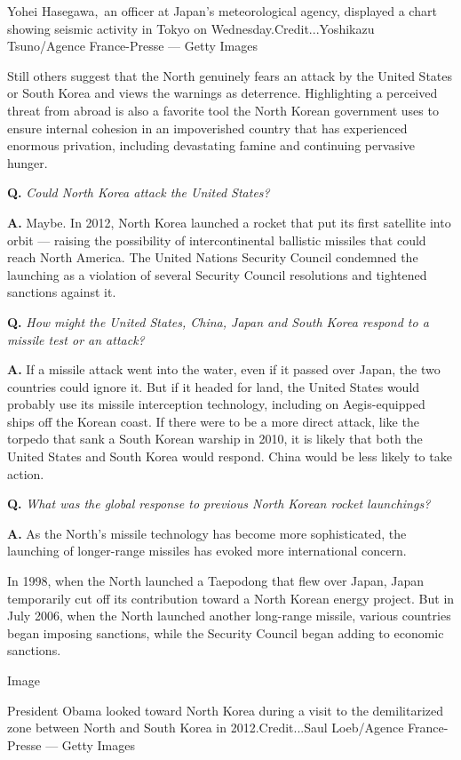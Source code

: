 Yohei Hasegawa,~an officer at Japan's meteorological agency, displayed a
chart showing seismic activity in Tokyo on Wednesday.Credit...Yoshikazu
Tsuno/Agence France-Presse --- Getty Images

Still others suggest that the North genuinely fears an attack by the
United States or South Korea and views the warnings as deterrence.
Highlighting a perceived threat from abroad is also a favorite tool the
North Korean government uses to ensure internal cohesion in an
impoverished country that has experienced enormous privation, including
devastating famine and continuing pervasive hunger.

\textbf{Q.} \emph{Could North Korea attack the United States?}

\textbf{A.} Maybe. In 2012, North Korea launched a rocket that put its
first satellite into orbit --- raising the possibility of
intercontinental ballistic missiles that could reach North America. The
United Nations Security Council condemned the launching as a violation
of several Security Council resolutions and tightened sanctions against
it.

\textbf{Q.} \emph{How might the United States, China, Japan and South
Korea respond to a missile test or an attack?}

\textbf{A.} If a missile attack went into the water, even if it passed
over Japan, the two countries could ignore it. But if it headed for
land, the United States would probably use its missile interception
technology, including on Aegis-equipped ships off the Korean coast. If
there were to be a more direct attack, like the torpedo that sank a
South Korean warship in 2010, it is likely that both the United States
and South Korea would respond. China would be less likely to take
action.

\textbf{Q.} \emph{What was the global response to previous North Korean
rocket launchings?}

\textbf{A.} As the North's missile technology has become more
sophisticated, the launching of longer-range missiles has evoked more
international concern.

In 1998, when the North launched a Taepodong that flew over Japan, Japan
temporarily cut off its contribution toward a North Korean energy
project. But in July 2006, when the North launched another long-range
missile, various countries began imposing sanctions, while the Security
Council began adding to economic sanctions.

Image

President Obama looked toward North Korea during a visit to the
demilitarized zone between North and South Korea in 2012.Credit...Saul
Loeb/Agence France-Presse --- Getty Images

